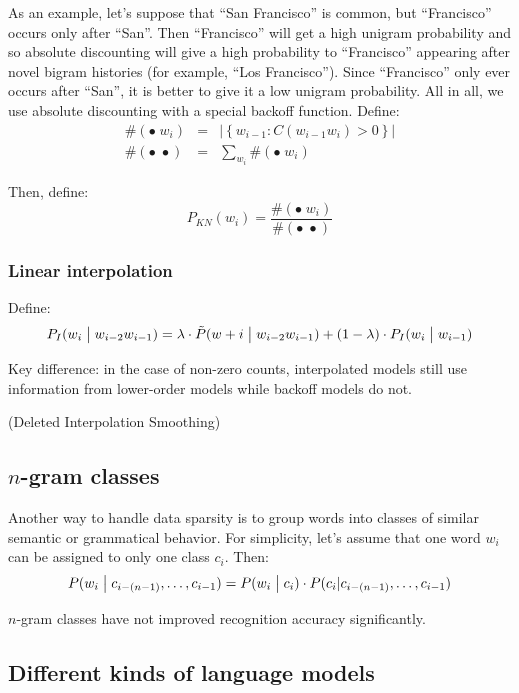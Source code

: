 As an example, let's suppose that ``San Francisco'' is common, but ``Francisco'' occurs only after ``San''. Then ``Francisco'' will get a high unigram probability and so absolute discounting will give a high probability to ``Francisco'' appearing after novel bigram histories (for example, ``Los Francisco''). Since ``Francisco'' only ever occurs after ``San'', it is better to give it a low unigram probability. All in all, we use absolute discounting with a special backoff function. Define:
\begin{eqnarray*}
    \#(\bullet \; w_i) &=& \left|\left\{w_{i-1} : C(w_{i-1}w_i) > 0 \right\}\right| \\
    \#(\bullet \; \bullet) &=& \sum\limits_{w_i} \#(\bullet \; w_i)
\end{eqnarray*}

Then, define:
\[
    P_{KN}(w_i) = \frac{\#(\bullet \; w_i)}{\#(\bullet \; \bullet)}
\]

\subsubsection{Linear interpolation}

Define:
\[
    P_I(w_i \bigm| w_{i-2}w_{i-1}) = \lambda \cdot \tilde{P}(w+i \bigm| w_{i-2}w_{i-1}) + (1 - \lambda) \cdot P_I(w_{i} \bigm| w_{i-1})
\]

Key difference: in the case of non-zero counts, interpolated models still use information from lower-order models while backoff models do not.

(Deleted Interpolation Smoothing)

\subsection{$n$-gram classes}

Another way to handle data sparsity is to group words into classes of similar semantic or grammatical behavior. For simplicity, let's assume that one word $w_i$ can be assigned to only one class $c_i$. Then:
\[
    P(w_i \bigm| c_{i-(n-1)}, \ldots, c_{i-1}) = P(w_i \bigm| c_i) \cdot P(c_i | c_{i-(n-1)}, \ldots, c_{i-1})
\]

$n$-gram classes have not improved recognition accuracy significantly.

\subsection{Different kinds of language models}

